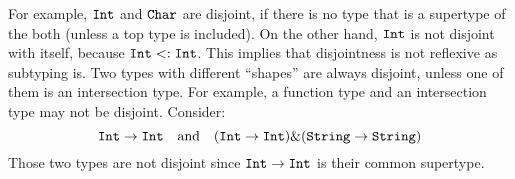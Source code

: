 For example, $\texttt{Int}$ and $\texttt{Char}$ are disjoint,
if there is
no type that is a supertype of the both (unless a top type is included). On the other hand, $\texttt{Int}$ is not
disjoint with itself, because $\texttt{Int} <: \texttt{Int}$. This implies that
disjointness is not reflexive as subtyping is. Two types with different ``shapes''
are always disjoint, unless one of them is an intersection type.
For example, a function type and an intersection
type may not be disjoint. Consider:
\[ \texttt{Int} \to \texttt{Int} \quad \text{and} \quad (\texttt{Int} \to \texttt{Int}) \& (\texttt{String} \to \texttt{String}) \]
Those two types are not disjoint since $\texttt{Int} \to \texttt{Int}$ is their common supertype.

%
%
%
%



